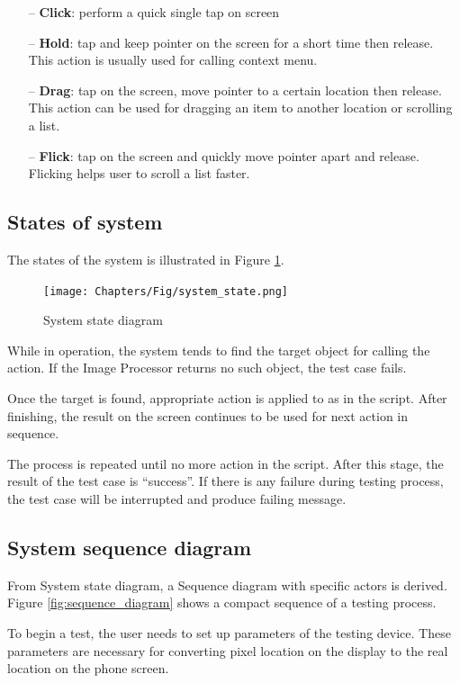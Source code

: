     \begin{itemize}
		\item[--] \textbf{Click}: perform a quick single tap on screen
		\item[--] \textbf{Hold}: tap and keep pointer on the screen for a short time then release. This action is usually used for calling context menu.
		\item[--] \textbf{Drag}: tap on the screen, move pointer to a certain location then release. This action can be used for dragging an item to another location or scrolling a list.
		\item[--] \textbf{Flick}: tap on the screen and quickly move pointer apart and release. Flicking helps user to scroll a list faster.
	\end{itemize}

\subsection{States of system}
The states of the system is illustrated in Figure \ref{fig:system_state}.

    \begin{figure}[H]
		\centering
		\texttt{[image: Chapters/Fig/system\_state.png]}
		\caption{System state diagram}
		\label{fig:system_state}
	\end{figure}

While in operation, the system tends to find the target object for calling the action. If the Image Processor returns no such object, the test case fails.

Once the target is found, appropriate action is applied to as in the script. After finishing, the result on the screen continues to be used for next action in sequence.

The process is repeated until no more action in the script. After this stage, the result of the test case is ``success''. If there is any failure during testing process, the test case will be interrupted and produce failing message.

\subsection{System sequence diagram}
From System state diagram, a Sequence diagram with specific actors is derived. Figure \ref{fig:sequence_diagram} shows a compact sequence of a testing process.

To begin a test, the user needs to set up parameters of the testing device. These parameters are necessary for converting pixel location on the display to the real location on the phone screen.

